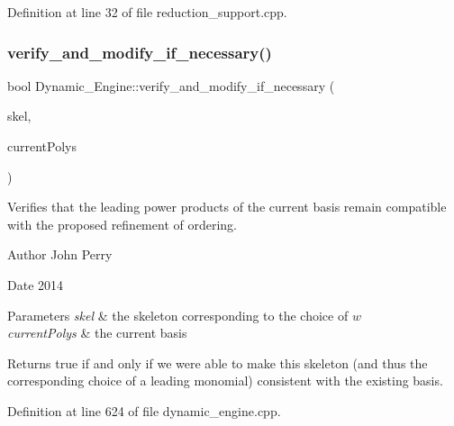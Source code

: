 Definition at line 32 of file reduction\+\_\+support.\+cpp.

\mbox{\label{group___g_b_computation_gaf3c21c23093fae5467dd770f790540f6}} 
\subsubsection{\texorpdfstring{verify\+\_\+and\+\_\+modify\+\_\+if\+\_\+necessary()}{verify\_and\_modify\_if\_necessary()}}
{\footnotesize\ttfamily bool Dynamic\+\_\+\+Engine\+::verify\+\_\+and\+\_\+modify\+\_\+if\+\_\+necessary (\begin{DoxyParamCaption}\item[{\hyperlink{group___c_l_s_solvers_class_l_p___solvers_1_1_l_p___solver}{L\+P\+\_\+\+Solver} $\ast$}]{skel,  }\item[{const list$<$ \hyperlink{group__polygroup_class_abstract___polynomial}{Abstract\+\_\+\+Polynomial} $\ast$ $>$ \&}]{current\+Polys }\end{DoxyParamCaption})}



Verifies that the leading power products of the current basis remain compatible with the proposed refinement of ordering. 

\begin{DoxyAuthor}{Author}
John Perry 
\end{DoxyAuthor}
\begin{DoxyDate}{Date}
2014 
\end{DoxyDate}

\begin{DoxyParams}{Parameters}
{\em skel} & the skeleton corresponding to the choice of $w$ \\
\hline
{\em current\+Polys} & the current basis \\
\hline
\end{DoxyParams}
\begin{DoxyReturn}{Returns}
{\ttfamily true} if and only if we were able to make this skeleton (and thus the corresponding choice of a leading monomial) consistent with the existing basis. 
\end{DoxyReturn}


Definition at line 624 of file dynamic\+\_\+engine.\+cpp.

